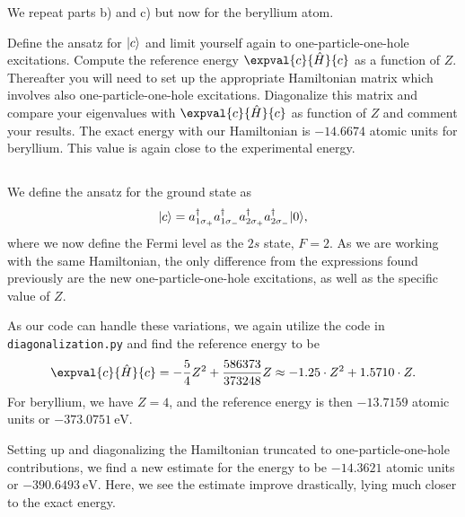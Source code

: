 We repeat parts b) and c) but now for the beryllium atom. %

Define the ansatz for $\lvert c\rangle$ and limit yourself again to one-particle-one-hole excitations.
Compute the reference energy $\expval{c}{\hat{H}}{c}$ as a function of $Z$.
Thereafter you will need to set up the appropriate Hamiltonian matrix which involves also one-particle-one-hole excitations.
Diagonalize this matrix and compare your eigenvalues with $\expval{c}{\hat{H}}{c}$ as function of $Z$ and comment your results.
The exact energy with our Hamiltonian is $-14.6674$ atomic units for beryllium.
This value is again close to the experimental energy.

\subsection{}
We define the ansatz for the ground state as
\begin{equation}
    \lvert c\rangle = a^\dagger_{1\sigma_{+}} a^\dagger_{1\sigma_{-}} a^\dagger_{2\sigma_{+}} a^\dagger_{2\sigma_{-}} \lvert0\rangle,
\end{equation}
where we now define the Fermi level as the $2s$ state, $F = 2$.
As we are working with the same Hamiltonian, the only difference from the expressions found previously are the new one-particle-one-hole excitations, as well as the specific value of $Z$.

As our code can handle these variations, we again utilize the code in \verb|diagonalization.py| and find the reference energy to be
\begin{equation}
    \expval{c}{\hat{H}}{c} = -\frac{5}{4} Z^2 + \frac{586373}{373248} Z \approx -1.25 \cdot Z^2 + 1.5710 \cdot Z.
\end{equation}
For beryllium, we have $Z = 4$, and the reference energy is then $-13.7159$ atomic units or $-373.0751 \ \text{eV}$.

Setting up and diagonalizing the Hamiltonian truncated to one-particle-one-hole contributions, we find a new estimate for the energy to be $-14.3621$ atomic units or $-390.6493 \ \text{eV}$.
Here, we see the estimate improve drastically, lying much closer to the exact energy.

